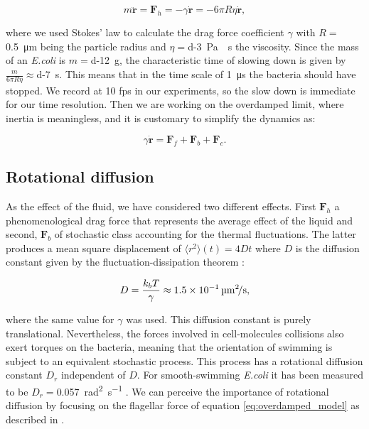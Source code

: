 \begin{equation}
	m\ddot{\textbf{r}} = \textbf{F}_h = -\gamma \dot{\textbf{r}} = - 6 \pi R \eta \dot{\textbf{r}},
\end{equation}

where we used Stokes' law to calculate the drag force coefficient $\gamma$ with $R=$\SI{0.5}{\micro\meter} being the particle radius and $\eta=$\SI{d-3}{\pascal\cdot\second} the viscosity. Since the mass of an \textit{E.coli} is $m=$\SI{d-12}{\gram}, the characteristic time of slowing down is given by $ \frac{m}{6 \pi R \eta} \approx $\SI{d-7}{\second}. This means that in the time scale of \SI{1}{\micro\second} the bacteria should have stopped. We record at 10 fps in our experiments, so the slow down is immediate for our time resolution. Then we are working on the overdamped limit, where inertia is meaningless, and it is customary to simplify the dynamics as:

\begin{equation} \label{eq:overdamped_model}
	\gamma \dot{\textbf{r}} = \textbf{F}_f + \textbf{F}_b + \textbf{F}_c.
\end{equation}

\subsection{Rotational diffusion}

As the effect of the fluid, we have considered two different effects. First $\textbf{F}_h$ a phenomenological drag force that represents the average effect of the liquid and second, $\textbf{F}_b$ of stochastic class accounting for the thermal fluctuations. The latter produces a mean square displacement of $\langle r^2 \rangle (t) = 4 D t $ where $D$ is the diffusion constant given by the fluctuation-dissipation theorem \cite{Soto2016KineticPhenomena}:

\begin{equation}
	D = \frac{k_bT}{\gamma} \approx \SI[per-mode = symbol]{1.5d-1}{\square\micro\meter \per \second},
\end{equation}
 
where the same value for $\gamma$ was used. This diffusion constant is purely translational. Nevertheless, the forces involved in cell-molecules collisions also exert torques on the bacteria, meaning that the orientation of swimming is subject to an equivalent stochastic process. This process has a rotational diffusion constant $D_r$ independent of $D$. For smooth-swimming \textit{E.coli} it has been measured to be $D_r=$\SI[per-mode = symbol]{0.057}{\square\radian \per \second} \cite{Drescher2011FluidScattering}. We can perceive the importance of rotational diffusion by focusing on the flagellar force of equation \eqref{eq:overdamped_model} as described in \cite{Lauga2020TheMotility}.

